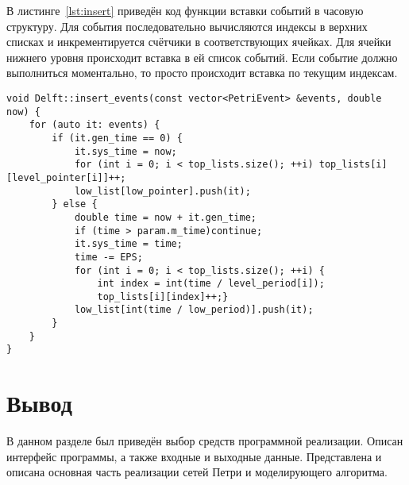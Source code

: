 В листинге~\ref{lst:insert} приведён код функции вставки событий в часовую структуру. Для события последовательно вычисляются индексы в верхних списках и инкрементируется счётчики в соответствующих ячейках. Для ячейки нижнего уровня происходит вставка в ей список событий. Если событие должно выполниться моментально, то просто происходит вставка по текущим индексам.

\begin{center}
	\captionsetup{justification=raggedright,singlelinecheck=off}
	\begin{lstlisting}[label=lst:insert,caption=Функция вставки событий,showstringspaces=false]
void Delft::insert_events(const vector<PetriEvent> &events, double now) {
	for (auto it: events) {
		if (it.gen_time == 0) {
			it.sys_time = now;
			for (int i = 0; i < top_lists.size(); ++i) top_lists[i][level_pointer[i]]++;
			low_list[low_pointer].push(it);
		} else {
			double time = now + it.gen_time;
			if (time > param.m_time)continue;
			it.sys_time = time;
			time -= EPS;
			for (int i = 0; i < top_lists.size(); ++i) {
				int index = int(time / level_period[i]);
				top_lists[i][index]++;}
			low_list[int(time / low_period)].push(it);
		}
	}
}
	\end{lstlisting}
\end{center}
\FloatBarrier

\section*{Вывод}

В данном разделе был приведён выбор средств программной реализации. Описан интерфейс программы, а также входные и выходные данные. Представлена и описана основная часть реализации сетей Петри и моделирующего алгоритма.
